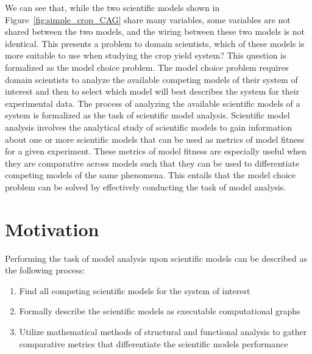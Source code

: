 We can see that, while the two scientific models shown in Figure~\ref{fig:simple_crop_CAG} share many variables, some variables are not shared between the two models, and the wiring between these two models is not identical.
This presents a problem to domain scientists, which of these models is more suitable to use when studying the crop yield system?
This question is formalized as the model choice problem.
The model choice problem requires domain scientists to analyze the available competing models of their system of interest and then to select which model will best describes the system for their experimental data.
The process of analyzing the available scientific models of a system is formalized as the task of scientific model analysis.
Scientific model analysis involves the analytical study of scientific models to gain information about one or more scientific models that can be used as metrics of model fitness for a given experiment.
These metrics of model fitness are especially useful when they are comparative across models such that they can be used to differentiate competing models of the same phenomena.
This entails that the model choice problem can be solved by effectively conducting the task of model analysis.


\section{Motivation\label{sec:motivation}}
Performing the task of model analysis upon scientific models can be described as the following process:
\begin{enumerate}
  \item Find all competing scientific models for the system of interest
  \item Formally describe the scientific models as executable computational graphs
  \item Utilize mathematical methods of structural and functional analysis to gather comparative metrics that differentiate the scientific models performance
\end{enumerate}

